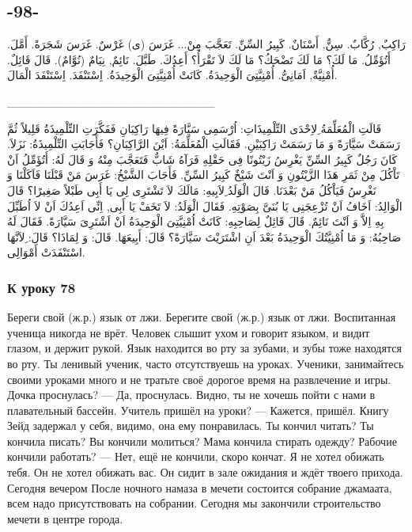 \documentclass[a5paper]{article}
\begin{document}
\subsection{-98-}
رَاكِبٌ, رُكَّابٌ. سِنٌّ, أَسْنَانٌ. كَبِيرُ السِّنِّ. تَعَجَّبَ مِنْ...\newline
غَرَسَ (ى) غَرْسٌ. غَرَسَ شَجَرَةً. أَمَّلَ. أَتُؤَمِّلُ.\newline
مَا لَكَ؟ مَا لَكَ تَضْحَكُ؟ مَا لَكَ لاَ تَقْرَأُ؟ أَعِدُكَ. طَبَّلَ.\newline
نَائِمٌ, نِيَامٌ (نُوَّامٌ). قَالَ قَائِلٌ. أُمْنِيَّةٌ, اَمَانِىُّ.\newline
أُمْنِيَّتِىَ الْوَحِيدَةُ. كَانَتْ أُمْنِيَّتِىَ الْوَحِيدَةُ. اِسْتَنْفَدَ.\newline
اِسْتَنْفَدَ الْمَالَ.

\_\_\_\_\_\_\_\_\_\_\_\_\_\_\_\_\_\_\_\_\_\_\_\_\_

قَالَتِ الْمُعَلِّمَةُ ِلاِحْدَى التِّلْمِيذَاتِ: اُرْسَمِى سَيَّارَةً فِيهَا رَاكِبَانِ فَفَكَّرَتِ التِّلْمِيذَةُ قَلِيلاً ثُمَّ رَسَمَتْ سَيَّارَةً وَ مَا رَسَمَتْ رَاكِبَيْنِ. فَقَالَتِ الْمُعَلِّمَةُ: اَيْنَ الرَّاكِبَانِ؟ فَأَجَابَتِ التِّلْمِيذَةُ: نَزَلاَ. كَانَ رَجُلٌ كَبِيرُ السِّنِّ يَغْرِسُ زَيْتُونًا فِى حَقْلِهِ فَرَآهُ شَابٌّ فَتَعَجَّبَ مِنْهُ وَ قَالَ لَهُ: أَتُؤَمِّلُ اَنْ تَاْكُلَ مِنْ ثَمَرِ هَذَا الزَّيْتُونِ وَ اَنْتَ شَيْخٌ كَبِيرُ السِّنِّ. فَأَجَابَ الشَّيْخُ: غَرَسَ مَنْ قَبْلَنَا فَاَكَلْنَا وَ نَغْرِسُ فَيَاْكُلُ مَنْ بَعْدَنَا. قَالَ الْوَلَدُ ِلاَبِيهِ: مَالَكَ لاَ تَشْتَرِى لِى يَا أَبِى طَبْلاً صَغِيرًا؟ قَالَ الْوَالِدُ: اَخَافُ اَنْ تُزْعِجَنِى يَا بُنَىَّ بِصَوْتِهِ. فَقَالَ الْوَلَدُ: لاَ تَخَفْ يَا أَبِى, اِنِّى اَعِدُكَ اَنْ لاَ اُطَبِّلَ بِهِ اِلاَّ وَ اَنْتَ نَائِمٌ. قَالَ قَائِلٌ لِصَاحِبِهِ: كَانَتْ اُمْنِيَّتِىَ الْوَحِيدَةُ اَنْ اَشْتَرِىَ سَيَّارَةً. فَقَالَ لَهُ صَاحِبُهُ: وَ مَا اُمْنِيَّتُكَ الْوَحِيدَةُ بَعْدَ اَنِ اشْتَرَيْتَ سَيَّارَةً؟ قَالَ: أَبِيعَهَا. قَالَ: وَ لِمَاذَا؟ قَالَ: ِلاَنَّهَا اسْتَنْفَدَتْ أَمْوَالِى.

\subsubsection{К уроку 78}
Береги свой (ж.р.) язык от лжи. Берегите свой (ж.р.) язык от лжи. Воспитанная ученица никогда не врёт. Человек слышит ухом и говорит языком, и видит глазом, и держит рукой. Язык находится во рту за зубами, и зубы тоже находятся во рту. Ты ленивый ученик, часто отсутствуешь на уроках. Ученики, занимайтесь своими уроками много и не тратьте своё дорогое время на развлечение и игры. Дочка проснулась? — Да, проснулась. Видно, ты не хочешь пойти с нами в плавательный бассейн. Учитель пришёл на уроки? — Кажется, пришёл. Книгу Зейд задержал у себя, видимо, она ему понравилась. Ты кончил читать? Ты кончила писать? Вы кончили молиться? Мама кончила стирать одежду? Рабочие кончили работать? — Нет, ещё не кончили, скоро кончат. Я не хотел обижать тебя. Он не хотел обижать вас. Он сидит в зале ожидания и ждёт твоего прихода. Сегодня вечером После ночного намаза в мечети состоится собрание джамаата, всем надо присутствовать на собрании. Сегодня мы закончили строительство мечети в центре города.
\end{document}
